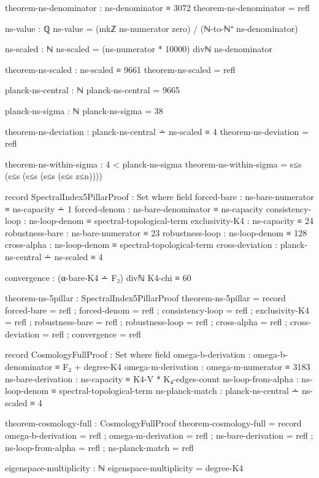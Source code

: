 \documentclass[11pt,a4paper]{book}
\begin{document}
\begin{code}
theorem-ns-denominator : ns-denominator ≡ 3072
theorem-ns-denominator = refl

ns-value : ℚ
ns-value = (mkℤ ns-numerator zero) / (ℕ-to-ℕ⁺ ns-denominator)

ns-scaled : ℕ
ns-scaled = (ns-numerator * 10000) divℕ ns-denominator

theorem-ns-scaled : ns-scaled ≡ 9661
theorem-ns-scaled = refl

planck-ns-central : ℕ
planck-ns-central = 9665

planck-ns-sigma : ℕ
planck-ns-sigma = 38

theorem-ns-deviation : planck-ns-central ∸ ns-scaled ≡ 4
theorem-ns-deviation = refl

theorem-ns-within-sigma : 4 < planck-ns-sigma
theorem-ns-within-sigma = s≤s (s≤s (s≤s (s≤s (s≤s z≤n))))

record SpectralIndex5PillarProof : Set where
  field
    forced-bare : ns-bare-numerator ≡ ns-capacity ∸ 1
    forced-denom : ns-bare-denominator ≡ ns-capacity
    consistency-loop : ns-loop-denom ≡ spectral-topological-term
    exclusivity-K4 : ns-capacity ≡ 24
    robustness-bare : ns-bare-numerator ≡ 23
    robustness-loop : ns-loop-denom ≡ 128
    cross-alpha : ns-loop-denom ≡ spectral-topological-term
    cross-deviation : planck-ns-central ∸ ns-scaled ≡ 4
    
    convergence : (α-bare-K4 ∸ F₂) divℕ K4-chi ≡ 60

theorem-ns-5pillar : SpectralIndex5PillarProof
theorem-ns-5pillar = record
  { forced-bare = refl
  ; forced-denom = refl
  ; consistency-loop = refl
  ; exclusivity-K4 = refl
  ; robustness-bare = refl
  ; robustness-loop = refl
  ; cross-alpha = refl
  ; cross-deviation = refl
  ; convergence = refl
  }

record CosmologyFullProof : Set where
  field
    omega-b-derivation : omega-b-denominator ≡ F₂ + degree-K4
    omega-m-derivation : omega-m-numerator ≡ 3183
    ns-bare-derivation : ns-capacity ≡ K4-V * K₄-edges-count
    ns-loop-from-alpha : ns-loop-denom ≡ spectral-topological-term
    ns-planck-match    : planck-ns-central ∸ ns-scaled ≡ 4

theorem-cosmology-full : CosmologyFullProof
theorem-cosmology-full = record
  { omega-b-derivation = refl
  ; omega-m-derivation = refl
  ; ns-bare-derivation = refl
  ; ns-loop-from-alpha = refl
  ; ns-planck-match    = refl
  }

eigenspace-multiplicity : ℕ
eigenspace-multiplicity = degree-K4


\end{code}
\end{document}
